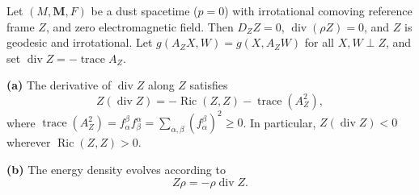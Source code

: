 Let $(M, \mathbf{M}, F)$ be a dust spacetime ($p = 0$) with irrotational comoving reference frame $Z$, and zero electromagnetic field. Then $D_Z Z = 0$, $\operatorname{div}(\rho Z) = 0$, and $Z$ is geodesic and irrotational. Let $g(A_Z X, W) = g(X, A_Z W)$ for all $X, W \perp Z$, and set $\operatorname{div} Z = -\operatorname{trace} A_Z$.

\textbf{(a)} The derivative of $\operatorname{div} Z$ along $Z$ satisfies
$$
Z(\operatorname{div} Z) = -\operatorname{Ric}(Z, Z) - \operatorname{trace}(A_Z^2),
$$
where $\operatorname{trace}(A_Z^2) = f_\alpha^\beta f_\beta^\alpha = \sum_{\alpha,\beta} (f_\alpha^\beta)^2 \geq 0$. In particular, $Z(\operatorname{div} Z) < 0$ wherever $\operatorname{Ric}(Z, Z) > 0$.

\textbf{(b)} The energy density evolves according to
$$
Z\rho = -\rho \operatorname{div} Z.
$$
